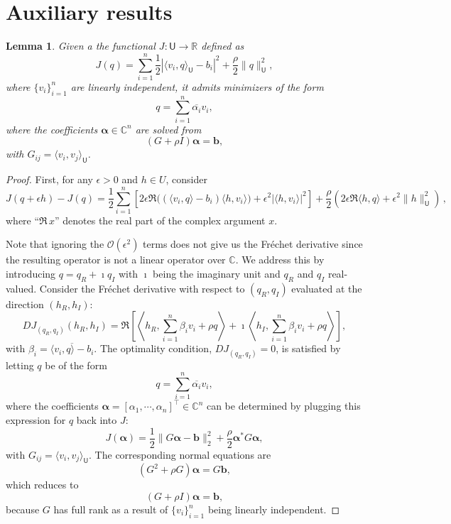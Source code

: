\documentclass[12pt]{amsart}
\newtheorem{lma}{Lemma}
\begin{document}





\appendix
\section{Auxiliary results}
\begin{lma}\label{lemma:optimality}
Given a the functional $J : \mathsf{U}\rightarrow \mathbb{R}$ defined as
\[
J(q) = \sum_{i=1}^n  {\textstyle\frac{1}{2}}|\langle v_i, q \rangle_{\mathsf{U}} - b_i|^2 +  {\textstyle\frac{\rho}{2}} \|q\|_{\mathsf{U}}^2,
\]
where $\{v_i\}_{i=1}^n$ are linearly independent, it admits minimizers of the form
\[
q = \sum_{i=1}^n \overline{\alpha_i} v_i,
\]
where the coefficients $\boldsymbol{\alpha} \in \mathbb{C}^n$ are solved from
\[
\left(G + \rho I\right)\boldsymbol{\alpha} = \mathbf{b},
\]
with $G_{ij} = \langle v_i, v_j\rangle_\mathsf{U}$.
\end{lma}
\begin{proof}
First, for any $\epsilon>0$ and $h\in U$, consider
\[
J(q + \epsilon h) - J(q) =  {\textstyle\frac{1}{2}}\sum_{i=1}^n \left[ {2} \epsilon \Re  \Big(\left(\langle v_i, q \rangle -  b_i\right)\langle h, v_i\rangle\Big) + \epsilon^2 |\langle h, v_i \rangle|^2\right] +  {\textstyle\frac{\rho}{2}}\left( {2}\epsilon \Re  \langle h, q\rangle + \epsilon^2 \|h\|_\mathsf{U}^2\right)\,,
\]
where ``$\Re\, x $'' denotes the real part of the complex argument $x$.

Note that ignoring the $\mathcal{O}(\epsilon^2)$ terms does not give us the Fr\'echet derivative since the resulting operator is not a linear operator over $\mathbb{C}$. We address this by introducing $q = q_R + \imath q_I$ with $\imath$ being the imaginary unit and $q_R$ and $q_I$ real-valued. Consider the Fr\'echet derivative with respect to $(q_R, q_I)$ evaluated at the direction $(h_R , h_I)$:
\[
DJ_{(q_R,q_I)}(h_R,h_I) = \Re\left[\left\langle h_R, \sum_{i=1}^n \beta_i v_i + \rho q \right\rangle + \imath \left\langle h_I,\sum_{i=1}^n \beta_i v_i + \rho q \right\rangle\right],
\]
with $\beta_i = \overline{\langle v_i, q \rangle -  b_i}$. The optimality condition, $DJ_{(q_R,q_I)} = 0$, is satisfied by letting $q$ be of the form
\[
q = \sum_{i=1}^n \overline{\alpha_i} v_i,
\]
where the coefficients $\boldsymbol{\alpha} = [\alpha_1,\cdots,\alpha_n]^\top \in \mathbb{C}^n$ can be determined by plugging this expression for $q$ back into $J$:
\[
J(\boldsymbol{\alpha}) =  {\textstyle\frac{1}{2}}\|G\boldsymbol{\alpha} - \mathbf{b}\|_2^2 +  {\textstyle\frac{\rho}{2}}\boldsymbol{\alpha}^*G\boldsymbol{\alpha},
\]
with $G_{ij} = \langle v_i, v_j\rangle_\mathsf{U}$.
The corresponding normal equations are
\[
\left(G^2 + \rho G\right)\boldsymbol{\alpha} = G\mathbf{b},
\]
which reduces to
\[
\left(G+ \rho I\right)\boldsymbol{\alpha} = \mathbf{b},
\]
because $G$ has full rank as a result of $\{v_i\}_{i=1}^n$ being linearly independent.
\end{proof}
\end{document}
